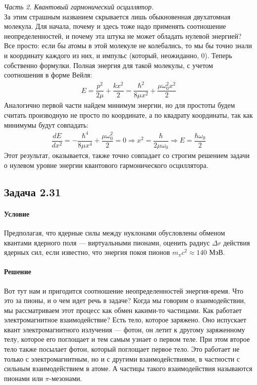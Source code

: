 \documentclass[12pt]{article}
\begin{document}
\vspace{6mm} \noindent
\textit{Часть 2. Квантовый гармонический осциллятор.}\vspace{3mm}\\
За этим страшным названием скрывается лишь обыкновенная двухатомная молекула. Для начала, почему и здесь тоже надо применять соотношение неопределенностей, и почему эта штука не может обладать нулевой энергией? Все просто: если бы атомы в этой молекуле не колебались, то мы бы точно знали и координату каждого из них, и импульс (который, неожиданно, 0). Теперь собственно формулки. Полная энергия для такой молекулы, с учетом соотношения в форме Вейля:
\begin{gather*}
     E = \dfrac{p^2}{2\mu} + \dfrac{kx^2}{2} = \dfrac{\hbar^2}{8\mu x^2} + \dfrac{\mu \omega_0^2 x^2}{2}
\end{gather*}
Аналогично первой части найдем минимум энергии, но для простоты будем считать производную не просто по координате, а по квадрату координаты, так как минимумы будут совпадать:
\begin{gather*}
    \dfrac{dE}{dx^2} = -\dfrac{\hbar^4}{8\mu x^4} + \dfrac{\mu \omega_0^2}{2} = 0 \Rightarrow x^2 = \dfrac{\hbar}{2\mu\omega_0} \Rightarrow E = \dfrac{\hbar\omega_0}{2}
\end{gather*}
Этот результат, оказывается, также точно совпадает со строгим решением задачи о нулевом уровне энергии квантового гармонического осциллятора.

\subsection{Задача 2.31}
\label{task_2.31}
\paragraph{Условие}
Предполагая, что ядерные силы между нуклонами обусловлены обменом квантами ядерного поля --- виртуальными пионами, оценить радиус $\Delta r$ действия ядерных сил, если известно, что энергия покоя пионов $m_{\pi}c^2 \approx 140$ МэВ.
\paragraph{Решение}
Вот тут нам и пригодится соотношение неопределенностей энергия-время. Что это за пионы, и о чем идет речь в задаче? Когда мы говорим о взаимодействии, мы рассматриваем этот процесс как обмен какими-то частицами. Как работает электромагнитное взаимодействие? Есть тело, которое заряжено. Оно испускает квант электромагнитного излучения --- фотон, он летит к другому заряженному телу, которое его поглощает и тем самым узнает о первом теле. При этом второе тело также посылает фотон, который поглощает первое тело. Это работает не только с электромагнитным, но и с другими взаимодействиями, в частности с сильным взаимодействием в атоме. А частицы такого взаимодействия называются пионами или $\pi$-мезонами.
\end{document}
